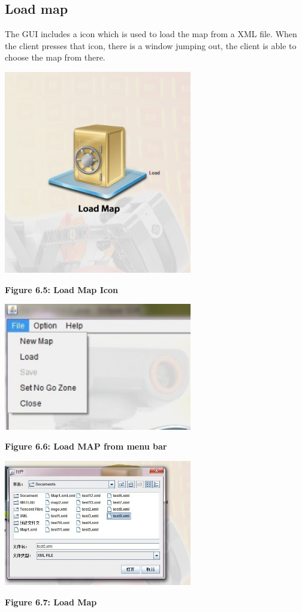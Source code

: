 \documentclass[11pt, a4paper]{report}
\begin{document}
\subsection{Load map}
The GUI includes a icon which is used to load the map from a XML file. When the client presses that icon, there is a window jumping out, the client is able to choose the map from there.
\begin{center}
 \includegraphics[width=8.20cm]{loadmap_quick}
\end{center}
\begin{center}
\textbf {Figure 6.5: Load Map Icon} \\[0.3cm]
\end{center}
\begin{center}
 \includegraphics[width=8.20cm]{Menu_file.jpg}
\end{center}
\begin{center}
\textbf {Figure 6.6: Load MAP from menu bar} \\[0.3cm]
\end{center}
\begin{center}
 \includegraphics[width=8.20cm]{LoadMap.jpg}
\end{center}
\begin{center}
\textbf {Figure 6.7: Load Map} \\[0.3cm]
\end{center}
\end{document}
